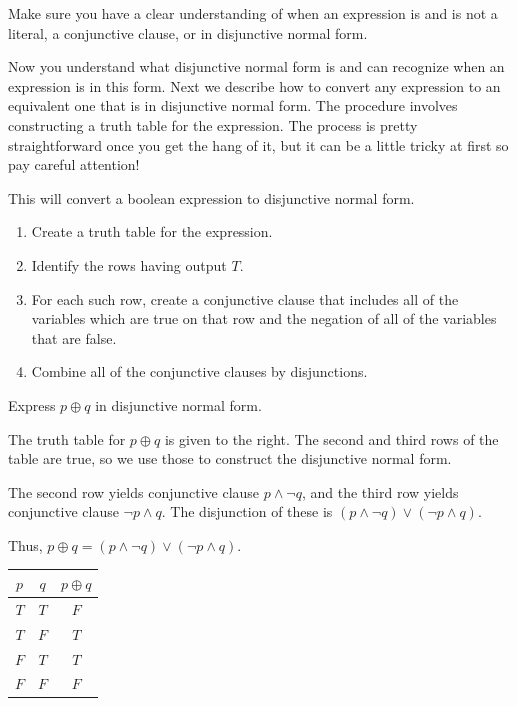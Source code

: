 Make sure you have a clear understanding of when an expression is and is not a literal, 
a conjunctive clause, or in disjunctive normal form.

Now you understand what disjunctive normal form is and can recognize when an expression is 
in this form. Next we describe how to convert any expression to an equivalent one
that is in disjunctive normal form. The procedure involves constructing a truth table
for the expression. The process is pretty straightforward once you get the hang of it, but
it can be a little tricky at first so pay careful attention!

\begin{proc}\label{dnfConvert}
This will convert a boolean expression to disjunctive normal form.
\begin{enumerate}
\item Create a truth table for the expression.
\item Identify the rows having output  $T$. 
\item For each such row, create a conjunctive clause that includes all of the
variables which are true on that row and the negation of all of the variables that
are false.
\item Combine all of the conjunctive clauses by disjunctions.
\end{enumerate}
\end{proc}

\begin{exa}
Express $p\oplus q$ in disjunctive normal form.
\begin{sol}
The truth table for $p\oplus q$ is given to the right.
The second and third rows of the table are true, so we use those to construct the 
disjunctive normal form.

\begin{minipage}{3.5in}
The second row yields conjunctive clause $p\wedge\neg q$, and the third row
yields conjunctive clause $\neg p\wedge q$.  The disjunction of these is
$(p\wedge\neg q)\vee(\neg p\wedge q)$.

Thus, $p\oplus q = (p\wedge\neg q)\vee(\neg p\wedge q)$.
\end{minipage}
\hfill
\begin{minipage}{1.25in}
\begin{tabular}{|cc||c|}
\hline 
$p$ & $q$ &$p\oplus q$\\
\hline 
$T$ & $T$& $F$ \\
$T$ & $F$& $T$ \\
$F$ & $T$& $T$ \\
$F$ & $F$& $F$ \\
\hline
\end{tabular}
\end{minipage}
\end{sol}
\end{exa}

